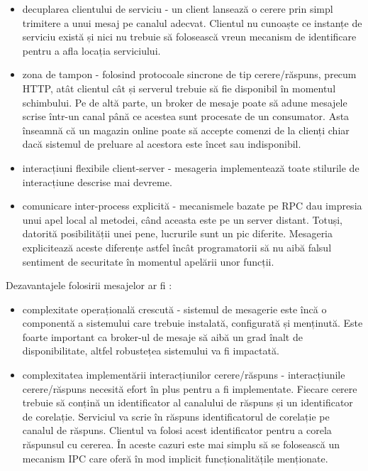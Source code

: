\documentclass[12pt, a4paper, oneside, romanian]{teza-upb}
\begin{document}
\begin{itemize}
 \item decuplarea clientului de serviciu - un client lansează o cerere prin simpl trimitere a unui mesaj pe canalul adecvat. Clientul nu cunoaște ce instanțe de serviciu există și nici nu trebuie să folosească vreun mecanism de identificare pentru a afla locația serviciului. 
 \item zona de tampon - folosind protocoale sincrone de tip cerere/răspuns, precum HTTP, atât clientul cât și serverul trebuie să fie disponibil în momentul schimbului.  Pe de altă parte, un broker de mesaje poate să adune mesajele scrise într-un canal până ce acestea sunt procesate de un consumator. Asta înseamnă că un magazin online poate să accepte comenzi de la clienți chiar dacă sistemul de preluare al acestora este încet sau indisponibil. 
 \item interacțiuni flexibile client-server - mesageria implementează toate stilurile de interacțiune descrise mai devreme.
 \item comunicare inter-process explicită - mecanismele bazate pe RPC dau impresia unui apel local al metodei, când aceasta este pe un server distant. Totuși, datorită posibilității unei pene, lucrurile sunt un pic diferite. Mesageria explicitează aceste diferențe astfel încât programatorii să nu aibă falsul sentiment de securitate în momentul apelării unor funcții. 
\end{itemize}

Dezavantajele folosirii mesajelor ar fi :

\begin{itemize}
 \item complexitate operațională crescută - sistemul de mesagerie este încă o componentă a sistemului care trebuie instalată, configurată și menținută. Este foarte important ca broker-ul de mesaje să aibă un grad înalt de disponibilitate, altfel robustețea sistemului va fi impactată. 
 \item complexitatea implementării interacțiunilor cerere/răspuns - interacțiunile cerere/răspuns necesită efort în plus pentru a fi implementate. Fiecare cerere trebuie să conțină un identificator al canalului de răspuns și un identificator de corelație. Serviciul va scrie în răspuns identificatorul de corelație pe canalul de răspuns. Clientul va folosi acest identificator pentru a corela răspunsul cu cererea. În aceste cazuri este mai simplu să se folosească un mecanism IPC care oferă în mod implicit funcționalitățile menționate. 
\end{itemize}
\end{document}
